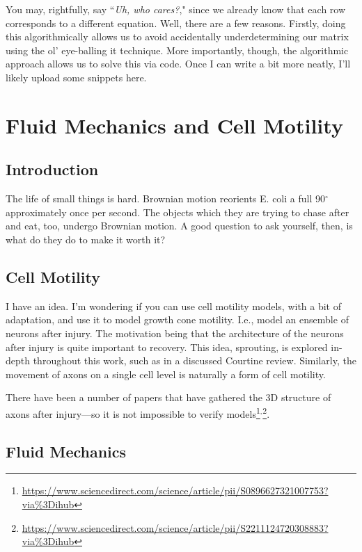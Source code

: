 \documentclass[12pt]{report}
\begin{document}
You may, rightfully, say ``\textit{Uh, who cares?}," since we already know that each row corresponds to a different equation. Well, there are a few reasons. Firstly, doing this algorithmically allows us to avoid accidentally underdetermining our matrix using the ol' eye-balling it technique. More importantly, though, the algorithmic approach allows us to solve this via code. Once I can write a bit more neatly, I'll likely upload some snippets here. 



\chapter{Fluid Mechanics and Cell Motility}

\section{Introduction}

The life of small things is hard. Brownian motion reorients E. coli a full 90$^\circ$ approximately once per second. The objects which they are trying to chase after and eat, too, undergo Brownian motion. A good question to ask yourself, then, is what do they do to make it worth it?

\section{Cell Motility}

I have an idea. I'm wondering if you can use cell motility models, with a bit of adaptation, and use it to model growth cone motility. I.e., model an ensemble of neurons after injury. The motivation being that the architecture of the neurons after injury is quite important to recovery. This idea, sprouting, is explored in-depth throughout this work, such as in a discussed Courtine review. Similarly, the movement of axons on a single cell level is naturally a form of cell motility. \newline

There have been a number of papers that have gathered the 3D structure of axons after injury---so it is not impossible to verify models\footnote{\url{https://www.sciencedirect.com/science/article/pii/S0896627321007753?via\%3Dihub}}$^,$\footnote{\url{https://www.sciencedirect.com/science/article/pii/S2211124720308883?via\%3Dihub}}. 


\section{Fluid Mechanics}
\end{document}
